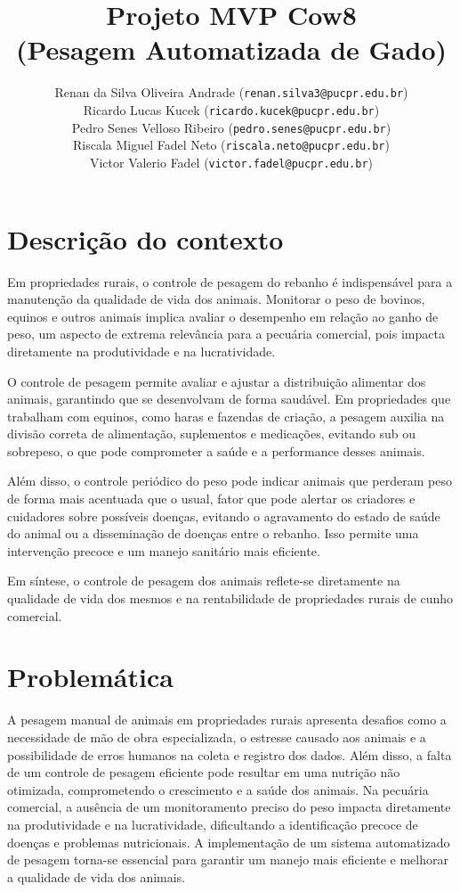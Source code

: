 \documentclass[11pt]{article}
\title{\textbf{Projeto MVP Cow8\\(Pesagem Automatizada de Gado)}}
\author{
    Renan da Silva Oliveira Andrade (\texttt{renan.silva3@pucpr.edu.br})\\
    Ricardo Lucas Kucek (\texttt{ricardo.kucek@pucpr.edu.br})\\
    Pedro Senes Velloso Ribeiro (\texttt{pedro.senes@pucpr.edu.br})\\ 
    Riscala Miguel Fadel Neto (\texttt{riscala.neto@pucpr.edu.br})\\
    Victor Valerio Fadel (\texttt{victor.fadel@pucpr.edu.br})
}
\begin{document}
\maketitle

\section{Descrição do contexto}

Em propriedades rurais, o controle de pesagem do rebanho é indispensável para a manutenção da qualidade de vida dos animais. Monitorar o peso de bovinos, equinos e outros animais implica avaliar o desempenho em relação ao ganho de peso, um aspecto de extrema relevância para a pecuária comercial, pois impacta diretamente na produtividade e na lucratividade.

O controle de pesagem permite avaliar e ajustar a distribuição alimentar dos animais, garantindo que se desenvolvam de forma saudável. Em propriedades que trabalham com equinos, como haras e fazendas de criação, a pesagem auxilia na divisão correta de alimentação, suplementos e medicações, evitando sub ou sobrepeso, o que pode comprometer a saúde e a performance desses animais.

Além disso, o controle periódico do peso pode indicar animais que perderam peso de forma mais acentuada que o usual, fator que pode alertar os criadores e cuidadores sobre possíveis doenças, evitando o agravamento do estado de saúde do animal ou a disseminação de doenças entre o rebanho. Isso permite uma intervenção precoce e um manejo sanitário mais eficiente.

Em síntese, o controle de pesagem dos animais reflete-se diretamente na qualidade de vida dos mesmos e na rentabilidade de propriedades rurais de cunho comercial.

\section{Problemática}
A pesagem manual de animais em propriedades rurais apresenta desafios como a necessidade de mão de obra especializada, o estresse causado aos animais e a possibilidade de erros humanos na coleta e registro dos dados. Além disso, a falta de um controle de pesagem eficiente pode resultar em uma nutrição não otimizada, comprometendo o crescimento e a saúde dos animais. Na pecuária comercial, a ausência de um monitoramento preciso do peso impacta diretamente na produtividade e na lucratividade, dificultando a identificação precoce de doenças e problemas nutricionais. A implementação de um sistema automatizado de pesagem torna-se essencial para garantir um manejo mais eficiente e melhorar a qualidade de vida dos animais.
\end{document}
